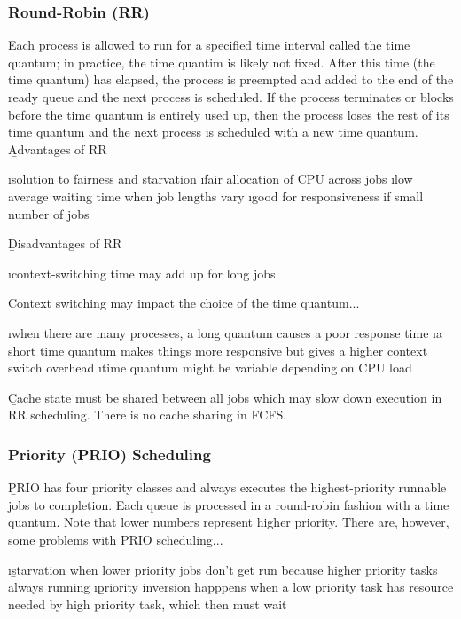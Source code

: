 \documentclass{article}
\begin{document}
    \subsubsection{Round-Robin (RR)}

    Each process is allowed to run for a specified time interval called the \b{time quantum}; in practice, the time quantim is likely not fixed. After this time (the time quantum) has elapsed, the process is preempted and added to the end of the ready queue and the next process is scheduled. If the process terminates or blocks before the time quantum is entirely used up, then the process loses the rest of its time quantum and the next process is scheduled with a new time quantum. \\
    
    \noindent \b{Advantages of RR}

    \bl
    \i solution to fairness and starvation
    \i fair allocation of CPU across jobs
    \i low average waiting time when job lengths vary
    \i good for responsiveness if small number of jobs
    \el

    \noindent \b{Disadvantages of RR}

    \bl 
    \i context-switching time may add up for long jobs
    \el 

    \noindent \b{Context switching} may impact the choice of the time quantum...

    \bl 
    \i when there are many processes, a long quantum causes a poor response time
    \i a short time quantum makes things more responsive but gives a higher context switch overhead
    \i time quantum might be variable depending on CPU load
    \el

    \noindent \b{Cache state} must be shared between all jobs which may slow down execution in RR scheduling. There is no cache sharing in FCFS. 

    \subsubsection{Priority (PRIO) Scheduling}

    \b{PRIO} has four priority classes and always executes the highest-priority runnable jobs to completion. Each queue is processed in a round-robin fashion with a time quantum. Note that lower numbers represent higher priority. There are, however, some \b{problems} with PRIO scheduling...

    \bl 
    \i \b{starvation} when lower priority jobs don't get run because higher priority tasks always running
    \i \b{priority inversion} happpens when a low priority task has resource needed by high priority task, which then must wait
    \el
\end{document}
